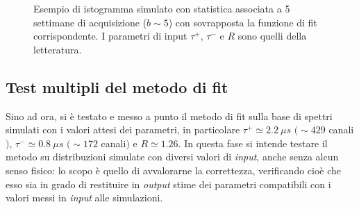 \documentclass[10pt, oneside, a4paper]{article}   	%
\begin{document}
\begin{figure}[h]
 \centerline{}
 \caption{Esempio di istogramma simulato con statistica associata a 5 settimane di acquisizione ($b\sim5$) con sovrapposta la funzione di fit corrispondente. I parametri di input $\tau^+$, $\tau^-$ e $R$ sono quelli della letteratura.}
 \label{fig::esempio_spettro_simulato}
\end{figure}
%
\subsection{Test multipli del metodo di fit}

Sino ad ora, si è testato e messo a punto il metodo di fit sulla base di spettri simulati con i valori attesi dei parametri, in particolare $\tau^+  \simeq 2.2  \ \mu s$ $(\sim 429$ canali$)$, $\tau^- \simeq 0.8 \  \mu s$ $(\sim 172$ canali$)$ e $R\simeq1.26$. 
In questa fase si intende testare il metodo su distribuzioni simulate con diversi valori di \textit{input}, anche senza alcun senso fisico: lo scopo è quello di avvalorarne la correttezza, verificando cioè che esso sia in grado di restituire in \textit{output} stime dei parametri compatibili con i valori messi in \textit{input} alle simulazioni. %
\end{document}
